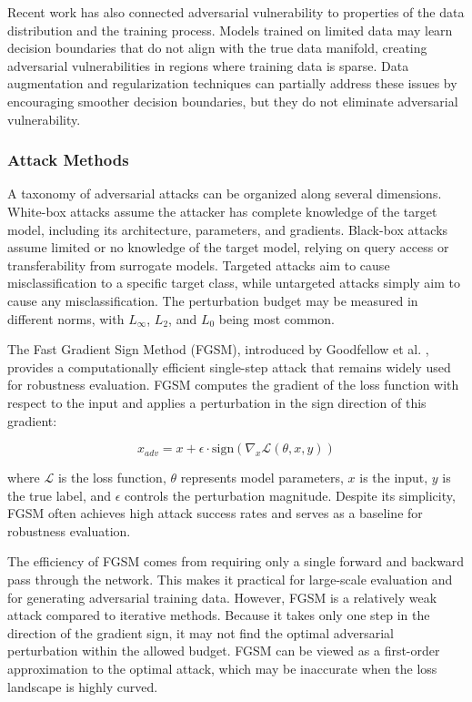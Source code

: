 \documentclass[12pt,a4paper]{article}
\begin{document}
Recent work has also connected adversarial vulnerability to properties of the data distribution and the training process. Models trained on limited data may learn decision boundaries that do not align with the true data manifold, creating adversarial vulnerabilities in regions where training data is sparse. Data augmentation and regularization techniques can partially address these issues by encouraging smoother decision boundaries, but they do not eliminate adversarial vulnerability.

\subsubsection{Attack Methods}

A taxonomy of adversarial attacks can be organized along several dimensions. White-box attacks assume the attacker has complete knowledge of the target model, including its architecture, parameters, and gradients. Black-box attacks assume limited or no knowledge of the target model, relying on query access or transferability from surrogate models. Targeted attacks aim to cause misclassification to a specific target class, while untargeted attacks simply aim to cause any misclassification. The perturbation budget may be measured in different norms, with $L_\infty$, $L_2$, and $L_0$ being most common.

The Fast Gradient Sign Method (FGSM), introduced by Goodfellow et al. \cite{goodfellow2015}, provides a computationally efficient single-step attack that remains widely used for robustness evaluation. FGSM computes the gradient of the loss function with respect to the input and applies a perturbation in the sign direction of this gradient:

\begin{equation}
    x_{adv} = x + \epsilon \cdot \text{sign}(\nabla_x \mathcal{L}(\theta, x, y))
\end{equation}

where $\mathcal{L}$ is the loss function, $\theta$ represents model parameters, $x$ is the input, $y$ is the true label, and $\epsilon$ controls the perturbation magnitude. Despite its simplicity, FGSM often achieves high attack success rates and serves as a baseline for robustness evaluation.

The efficiency of FGSM comes from requiring only a single forward and backward pass through the network. This makes it practical for large-scale evaluation and for generating adversarial training data. However, FGSM is a relatively weak attack compared to iterative methods. Because it takes only one step in the direction of the gradient sign, it may not find the optimal adversarial perturbation within the allowed budget. FGSM can be viewed as a first-order approximation to the optimal attack, which may be inaccurate when the loss landscape is highly curved.
\end{document}
